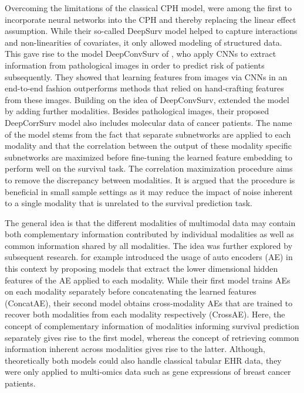 \documentclass[
]{krantz}
\begin{document}
Overcoming the limitations of the classical CPH model, \citet{Katzman2018} were among the first to incorporate neural networks into the CPH and thereby replacing the linear effect assumption. While their so-called DeepSurv model helped to capture interactions and non-linearities of covariates, it only allowed modeling of structured data. This gave rise to the model DeepConvSurv of \citet{DeepConvSurv}, who apply CNNs to extract information from pathological images in order to predict risk of patients subsequently. They showed that learning features from images via CNNs in an end-to-end fashion outperforms methods that relied on hand-crafting features from these images. Building on the idea of DeepConvSurv, \citet{DeepCorrSurv} extended the model by adding further modalities. Besides pathological images, their proposed DeepCorrSurv model also includes molecular data of cancer patients. The name of the model stems from the fact that separate subnetworks are applied to each modality and that the correlation between the output of these modality specific subnetworks are maximized before fine-tuning the learned feature embedding to perform well on the survival task. The correlation maximization procedure aims to remove the discrepancy between modalities. It is argued that the procedure is beneficial in small sample settings as it may reduce the impact of noise inherent to a single modality that is unrelated to the survival prediction task.

The general idea is that the different modalities of multimodal data may contain both complementary information contributed by individual modalities as well as common information shared by all modalities. The idea was further explored by subsequent research. \citet{TongAE} for example introduced the usage of auto encoders (AE) in this context by proposing models that extract the lower dimensional hidden features of the AE applied to each modality. While their first model trains AEs on each modality separately before concatenating the learned features (ConcatAE), their second model obtains cross-modality AEs that are trained to recover both modalities from each modality respectively (CrossAE). Here, the concept of complementary information of modalities informing survival prediction separately gives rise to the first model, whereas the concept of retrieving common information inherent across modalities gives rise to the latter. Although, theoretically both models could also handle classical tabular EHR data, they were only applied to multi-omics data such as gene expressions of breast cancer patients.
\end{document}
